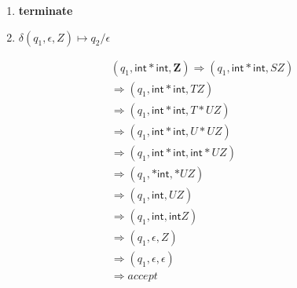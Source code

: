 {\begin{minipage}[t]{0.4\linewidth}
\begin{enumerate}[resume,start=3]
\begin{align*}
  \delta&(q_{1},\mathbf{(},\mathbf{(})& \mapsto &\quad q_{1}/\epsilon\\
  \delta&(q_{1},\mathbf{)},\mathbf{)})& \mapsto &\quad q_{1}/\epsilon
  \end{align*}
\item \textbf{terminate}
\item[] $\delta(q_{1},\epsilon,Z) \mapsto q_{2}/\epsilon$
\end{enumerate}
\end{minipage}
\begin{minipage}[t]{0.55\linewidth}
\setlength{\abovedisplayskip}{-1em}
\setlength{\belowdisplayskip}{0pt}
  \begin{align*}
    & (q_{1},\mathsf{int * int}, \mathbf{Z}) \Rightarrow (q_{1}, \mathsf{int * int}, SZ)\\
    &\Rightarrow (q_{1}, \mathsf{int * int}, TZ)\\
    &\Rightarrow (q_{1}, \mathsf{int * int}, T*UZ)\\
    &\Rightarrow (q_{1}, \mathsf{int * int}, U*UZ)\\
    &\Rightarrow (q_{1}, \mathsf{int * int}, \mathsf{int}*UZ)\\
    &\Rightarrow (q_{1}, \mathsf{ * int}, *UZ)\\
    &\Rightarrow (q_{1}, \mathsf{int}, UZ)\\
    &\Rightarrow (q_{1}, \mathsf{int}, \mathsf{int}Z)\\
    &\Rightarrow (q_{1}, \epsilon, Z) \\
    &\Rightarrow (q_{1}, \epsilon, \epsilon)\\
    &\Rightarrow accept
  \end{align*}
\end{minipage}
}
